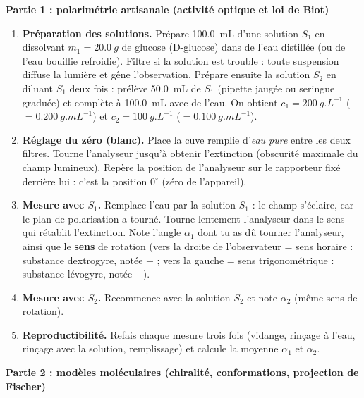 \documentclass[11pt]{article}
\providecommand{\degree}{^{\circ}}
\newcommand{\cle}[1]{{\popxbold\color{popdark}#1}}
\newcounter{popsec}
\newcounter{popsub}
\newcommand{\courssub}[1]{%
  \stepcounter{popsub}%
  \par\vspace{9pt}\noindent{\popxbold\fontsize{11.5}{13}\selectfont\color{popink}{\color{poporange}\thepopsec.\thepopsub}\hspace{6pt}#1}\par\nopagebreak\vspace{4pt}
}
\begin{document}
\courssub{Protocole}

\textbf{Partie 1 : polarimétrie artisanale (activité optique et loi de Biot)}

\begin{enumerate}
\item \textbf{Préparation des solutions.} Prépare \SI{100,0}{mL} d'une solution $S_1$ en dissolvant $m_1 = \SI{20,0}{g}$ de glucose (D-glucose) dans de l'eau distillée (ou de l'eau bouillie refroidie). Filtre si la solution est trouble : toute suspension diffuse la lumière et gêne l'observation. Prépare ensuite la solution $S_2$ en diluant $S_1$ deux fois : prélève \SI{50,0}{mL} de $S_1$ (pipette jaugée ou seringue graduée) et complète à \SI{100,0}{mL} avec de l'eau. On obtient $c_1 = \SI{200}{g.L^{-1}}$ ($= \SI{0,200}{g.mL^{-1}}$) et $c_2 = \SI{100}{g.L^{-1}}$ ($= \SI{0,100}{g.mL^{-1}}$).
\item \textbf{Réglage du zéro (blanc).} Place la cuve remplie d'\emph{eau pure} entre les deux filtres. Tourne l'analyseur jusqu'à obtenir l'\cle{extinction} (obscurité maximale du champ lumineux). Repère la position de l'analyseur sur le rapporteur fixé derrière lui : c'est la position $0\degree$ (zéro de l'appareil).
\item \textbf{Mesure avec $S_1$.} Remplace l'eau par la solution $S_1$ : le champ s'éclaire, car le plan de polarisation a tourné. Tourne lentement l'analyseur dans le sens qui rétablit l'extinction. Note l'angle $\alpha_1$ dont tu as dû tourner l'analyseur, ainsi que le \textbf{sens} de rotation (vers la droite de l'observateur = sens horaire : substance \cle{dextrogyre}, notée $+$ ; vers la gauche = sens trigonométrique : substance \cle{lévogyre}, notée $-$).
\item \textbf{Mesure avec $S_2$.} Recommence avec la solution $S_2$ et note $\alpha_2$ (même sens de rotation).
\item \textbf{Reproductibilité.} Refais chaque mesure trois fois (vidange, rinçage à l'eau, rinçage avec la solution, remplissage) et calcule la moyenne $\bar{\alpha}_1$ et $\bar{\alpha}_2$.
\end{enumerate}

\textbf{Partie 2 : modèles moléculaires (chiralité, conformations, projection de Fischer)}
\end{document}
